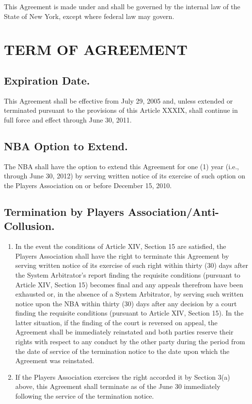 \documentclass[
]{book}
\providecommand{\tightlist}{%
  \setlength{\itemsep}{0pt}\setlength{\parskip}{0pt}}
\begin{document}
This Agreement is made under and shall be governed by the internal law of the State of New York, except where federal law may govern.

\hypertarget{term-of-agreement}{%
\chapter{TERM OF AGREEMENT}\label{term-of-agreement}}

\hypertarget{expiration-date.}{%
\section{Expiration Date.}\label{expiration-date.}}

This Agreement shall be effective from July 29, 2005 and, unless extended or terminated pursuant to the provisions of this Article XXXIX, shall continue in full force and effect through June 30, 2011.

\hypertarget{nba-option-to-extend.}{%
\section{NBA Option to Extend.}\label{nba-option-to-extend.}}

The NBA shall have the option to extend this Agreement for one (1) year (i.e., through June 30, 2012) by serving written notice of its exercise of such option on the Players Association on or before December 15, 2010.

\hypertarget{termination-by-players-associationanti-collusion.}{%
\section{Termination by Players Association/Anti-Collusion.}\label{termination-by-players-associationanti-collusion.}}

\begin{enumerate}
\def\labelenumi{(\alph{enumi})}
\tightlist
\item
  In the event the conditions of Article XIV, Section 15 are satisfied, the Players Association shall have the right to terminate this Agreement by serving written notice of its exercise of such right within thirty (30) days after the System Arbitrator's report finding the requisite conditions (pursuant to Article XIV, Section 15) becomes final and any appeals therefrom have been exhausted or, in the absence of a System Arbitrator, by serving such written notice upon the NBA within thirty (30) days after any decision by a court finding the requisite conditions (pursuant to Article XIV, Section 15). In the latter situation, if the finding of the court is reversed on appeal, the Agreement shall be immediately reinstated and both parties reserve their rights with respect to any conduct by the other party during the period from the date of service of the termination notice to the date upon which the Agreement was reinstated.
\item
  If the Players Association exercises the right accorded it by Section 3(a) above, this Agreement shall terminate as of the June 30 immediately following the service of the termination notice.
\end{enumerate}
\end{document}
